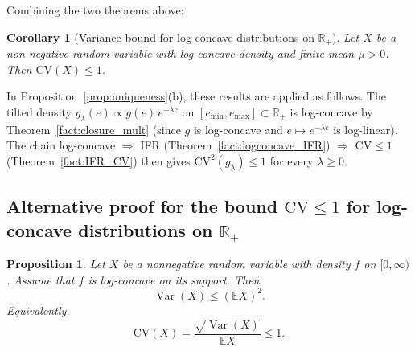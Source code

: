 \documentclass[12pt,a4paper]{article}
\theoremstyle{definition}
\theoremstyle{plain}
\newtheorem{proposition}{Proposition}[section]
\newtheorem{corollary}{Corollary}[section]
\theoremstyle{remark}
\newcommand{\R}{\mathbb{R}}
\begin{document}
Combining the two theorems above:

\begin{corollary}[Variance bound for log-concave distributions on $\R_+$]
\label{fact:logconcave_CV}
Let $X$ be a non-negative random variable with log-concave
density and finite mean $\mu > 0$.  Then
$\mathrm{CV}(X) \leq 1$.
\end{corollary}

In Proposition~\ref{prop:uniqueness}(b), these results are
applied as follows.  The tilted density
$g_\lambda(e) \propto g(e)\,e^{-\lambda e}$ on
$[e_{\min}, e_{\max}] \subset \R_+$ is log-concave by
Theorem~\ref{fact:closure_mult} (since $g$ is log-concave and
$e \mapsto e^{-\lambda e}$ is log-linear).
The chain
log-concave $\Rightarrow$ IFR
(Theorem~\ref{fact:logconcave_IFR})
$\Rightarrow$ $\mathrm{CV} \leq 1$
(Theorem~\ref{fact:IFR_CV})
then gives $\mathrm{CV}^2(g_\lambda) \leq 1$ for every
$\lambda \geq 0$.

\subsection{Alternative proof for the bound $\mathrm{CV} \leq 1$ for log-concave distributions on $\R_+$}
\begin{proposition}
  Let $X$ be a nonnegative random variable with density $f$ on $[0,\infty)$.
  Assume that $f$ is log-concave on its support. Then
  \[
  \operatorname{Var}(X)\le (\mathbb E X)^2.
  \]
  Equivalently,
  \[
  \mathrm{CV}(X)=\frac{\sqrt{\operatorname{Var}(X)}}{\mathbb E X}\le 1.
  \]
  \end{proposition}
  
\end{document}

